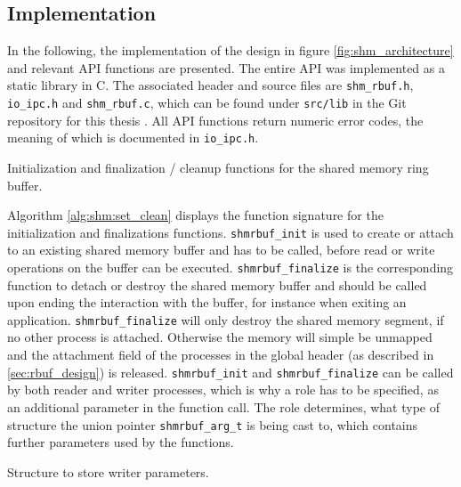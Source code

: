 \subsection{Implementation}
In the following, the implementation of the design in figure \ref{fig:shm_architecture} and relevant API functions are presented.
The entire API was implemented as a static library in C. The associated header and source files are \texttt{shm\_rbuf.h}, \texttt{io\_ipc.h} and \texttt{shm\_rbuf.c}, which can be found 
under \texttt{src/lib} in the Git repository for this thesis \cite{gitlab}. All API functions return numeric error codes, the meaning of which is documented in \texttt{io\_ipc.h}.  
\par
\begin{algorithm}[h!]
    
    \caption[Shared Memory Ringbuffer: Initialization and Cleanup]{Initialization and finalization / cleanup functions for the shared memory ring buffer.}
    \label{alg:shm:set_clean}
\end{algorithm}
Algorithm \ref{alg:shm:set_clean} displays the function signature for the initialization and finalizations functions.
\texttt{shmrbuf\_init} is used to create or attach to an existing shared memory buffer and has to be called, before read or write operations
on the buffer can be executed. \texttt{shmrbuf\_finalize} is the corresponding function to detach or destroy the shared memory buffer and should be called
upon ending the interaction with the buffer, for instance when exiting an application. \texttt{shmrbuf\_finalize} will only destroy the shared memory segment,
if no other process is attached. Otherwise the memory will simple be unmapped and the attachment field of the processes in the global header (as described in \ref{sec:rbuf_design}) is released. 
\texttt{shmrbuf\_init} and \texttt{shmrbuf\_finalize} can be called by both reader and writer 
processes, which is why a role has to be specified, as an additional parameter in the function call. The role determines, what type of structure the union pointer \texttt{shmrbuf\_arg\_t} is being cast to,
which contains further parameters used by the functions. 

\begin{algorithm}[h!]
    
    \caption[Shared Memory Ringbuffer: Writer Parameters]{Structure to store writer parameters.}
    \label{alg:shm:writer_arg}
\end{algorithm}

